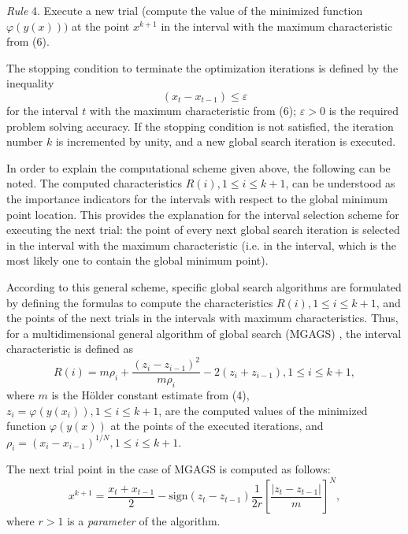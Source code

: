\documentclass[
11pt,%
tightenlines,%
twoside,%
onecolumn,%
nofloats,%
nobibnotes,%
nofootinbib,%
superscriptaddress,%
noshowpacs,%
centertags]%
{revtex4}
\begin{document}
\textit{Rule} 4. Execute a new trial (compute the value of the minimized function $\varphi(y(x)))$ at the point $x^{k+1}$ in the interval with the maximum characteristic from (6).

The stopping condition to terminate the optimization iterations is defined by the inequality
\begin{equation}
(x_t - x_{t-1}) \leq \varepsilon
\end{equation}
for the interval $t$ with the maximum characteristic from (6); $\varepsilon > 0$ is the required problem solving accuracy. If the stopping condition is not satisfied, the iteration number $k$ is incremented by unity, and a new global search iteration is executed.

In order to explain the computational scheme given above, the following can be noted. The computed characteristics $R(i), 1 \leq i \leq k + 1$, can be understood as the importance indicators for the intervals with respect to the global minimum point location. This provides the explanation for the interval selection scheme for executing the next trial: the point of every next global search iteration is selected in the interval with the maximum characteristic (i.e. in the interval, which is the most likely one to contain the global minimum point).

According to this general scheme, specific global search algorithms are formulated by defining the formulas to compute the characteristics $R(i), 1 \leq i \leq k+1$, and the points of the next trials in the intervals with maximum characteristics. Thus, for a multidimensional general algorithm of global search (MGAGS) \cite{Strongin1}, the interval characteristic is defined as
\begin{equation}
R(i)=m\rho_i+\frac{(z_i-z_{i-1})^2}{m\rho_i}-2 (z_i + z_{i-1}), 1 \leq i \leq k + 1,
\end{equation}
where $m$ is the H\"older constant estimate from (4), $z_i = \varphi(y(x_i)), 1 \leq i \leq k + 1$, are the computed values of the minimized function $\varphi(y(x))$ at the points of the executed iterations, and $\rho_i = \left(x_i - x_{i-1} \right)^{1/N}, 1 \leq i \leq k + 1$.

The next trial point in the case of MGAGS is computed as follows:
\begin{equation}
x^{k+1} = \frac{x_t+x_{t-1}}{2} - \mathrm{sign}(z_t-z_{t-1})\frac{1}{2r}\left[\frac{\left|z_t-z_{t-1}\right|}{m}\right]^N,
\end{equation}
where $r > 1$ is a \textit{parameter} of the algorithm.
\end{document}
